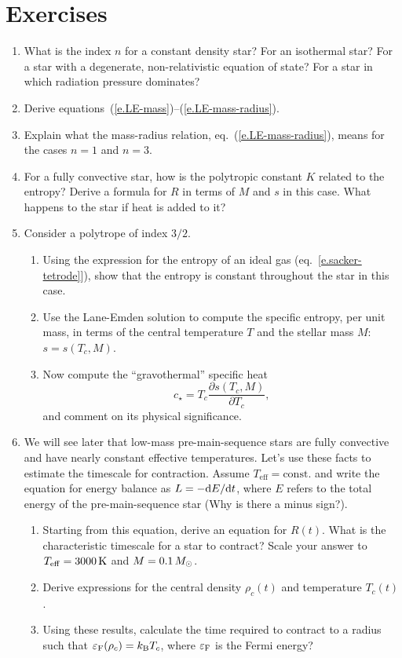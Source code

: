\section{Exercises}\label{s.LE-exercises}
\begin{enumerate}
\item What is the index $n$ for a constant density star? For an isothermal star? For a star with a degenerate, non-relativistic equation of state? For a star in which radiation pressure dominates?

\item Derive equations~(\ref{e.LE-mass})--(\ref{e.LE-mass-radius}).

\item Explain what the mass-radius relation, eq.~(\ref{e.LE-mass-radius}), means for the cases $n=1$ and $n=3$.

\item For a fully convective star, how is the polytropic constant $K$ related to the entropy? Derive a formula for $R$ in terms of $M$ and $s$ in this case.  What happens to the star if heat is added to it?

\item Consider a polytrope of index $3/2$.
\begin{enumerate}
\item Using the expression for the entropy of an ideal gas (eq.~\ref{e.sacker-tetrode}]), show that the entropy is constant throughout the star in this case.
\item Use the Lane-Emden solution to compute the specific entropy, per unit mass, in terms of the central temperature $T$ and the stellar mass $M$: $s = s(T_{c},M)$.
\item Now compute the ``gravothermal'' specific heat
\begin{equation}\label{e.cstar}
c_{\star} = T_{c}\frac{\partial s(T_{c},M)}{\partial T_{c}},
\end{equation}
and comment on its physical significance.
\end{enumerate}

\item We will see later that low-mass pre-main-sequence stars are fully convective and have nearly constant effective temperatures.  Let's use these facts to estimate the timescale for contraction.  Assume $T_{\mathrm{eff}} = \mathrm{const.}$ and write the equation for energy balance as $L = -\mathrm{d} E/\mathrm{d} t$, where $E$ refers to the total energy of the pre-main-sequence star (Why is there a minus sign?).  
\begin{enumerate}
\item Starting from this equation, derive an equation for $R(t)$. What is the characteristic timescale for a star to contract? Scale your answer to $T_{\mathrm{eff}} = 3000\,\mathrm{K}$ and $M = 0.1\,M_\odot$.  
\item Derive expressions for the central density $\rho_{c}(t)$ and temperature $T_{c}(t)$.
\item Using these results, calculate the time required to contract to a radius such that $\varepsilon_{\mathrm{F}}(\rho_{c}) = k_\mathrm{B} T_{c}$, where $\varepsilon_{\mathrm{F}}$ is the Fermi energy?
\end{enumerate}
\end{enumerate}
